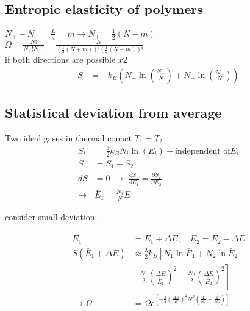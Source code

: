 \subsection*{Entropic elasticity of polymers}
$ N_+ - N_- = \frac{L}{a} = m \rightarrow N_+ = \frac{1}{2} \left(N + m\right)$\\
$\Omega = \frac{N!}{N_+ ! N_- !} = \frac{N!}{\left(\frac{1}{2}\left(N+m\right)\right)! \left(\frac{1}{2}\left(N-m\right)\right)!}$\\
if both directions are possible $x2$
\[
    \begin{aligned}
        S &= -k_B \left(N_+ \ln \left(\frac{N_+}{N}\right)+N_-\ln\left(\frac{N_-}{N}\right)\right)
    \end{aligned}
\]

\subsection*{Statistical deviation from average}
Two ideal gases in thermal conact $T_1 = T_2$ 
\[
    \begin{aligned}
        S_i &= \frac{3}{2} k_B N_i \ln (E_i) + \text{independent of} E_i \\
        S &= S_1 + S_2 \\
        dS &= 0 \; \rightarrow \; \frac{\partial S_1}{\partial E_1} = \frac{\partial S_2}{\partial E_2} \\
        \rightarrow & \bar{E}_1 = \frac{N_1}{N} E
    \end{aligned}
\]

consider small deviation:

\[
    \begin{aligned}
        E_1 &= \bar{E}_1 + \Delta E, \quad E_2 = \bar{E}_2 - \Delta E \\
        S(\bar{E}_1 + \Delta E) &\approx \frac{3}{2} k_B \left[N_1 \ln \bar{E}_1 + N_2 \ln \bar{E}_2  \right. \\
            &\left. - \frac{N_1}{2} \left(\frac{\Delta E}{\bar{E}_1}\right)^2 - \frac{N_2}{2} \left(\frac{\Delta E}{\bar{E}_2}\right)^2\right] \\
        \rightarrow \Omega &= \bar{\Omega} e^{\left[-\frac{3}{4} \left(\frac{\Delta E}{E}\right)^2 N^2 \left(\frac{1}{N_1}+\frac{1}{N_2}\right)\right]}
    \end{aligned}
\]